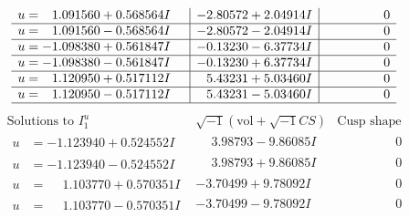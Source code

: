 \documentclass[1p]{elsarticle_modified}
\theoremstyle{definition}
\newcommand{\I}{\sqrt{-1}}
\begin{document}
$$\begin{array}{c|c|c}
\begin{aligned}
u &= \phantom{-}1.091560 + 0.568564 I\end{aligned}
 & -2.80572 + 2.04914 I & \phantom{-0.000000 } 0 \\ \hline\begin{aligned}
u &= \phantom{-}1.091560 - 0.568564 I\end{aligned}
 & -2.80572 - 2.04914 I & \phantom{-0.000000 } 0 \\ \hline\begin{aligned}
u &= -1.098380 + 0.561847 I\end{aligned}
 & -0.13230 - 6.37734 I & \phantom{-0.000000 } 0 \\ \hline\begin{aligned}
u &= -1.098380 - 0.561847 I\end{aligned}
 & -0.13230 + 6.37734 I & \phantom{-0.000000 } 0 \\ \hline\begin{aligned}
u &= \phantom{-}1.120950 + 0.517112 I\end{aligned}
 & \phantom{-}5.43231 + 5.03460 I & \phantom{-0.000000 } 0 \\ \hline\begin{aligned}
u &= \phantom{-}1.120950 - 0.517112 I\end{aligned}
 & \phantom{-}5.43231 - 5.03460 I & \phantom{-0.000000 } 0\\
 \hline 
 \end{array}$$\newpage$$\begin{array}{c|c|c}  
\text{Solutions to }I^u_{1}& \I (\text{vol} + \sqrt{-1}CS) & \text{Cusp shape}\\
 \hline 
\begin{aligned}
u &= -1.123940 + 0.524552 I\end{aligned}
 & \phantom{-}3.98793 - 9.86085 I & \phantom{-0.000000 } 0 \\ \hline\begin{aligned}
u &= -1.123940 - 0.524552 I\end{aligned}
 & \phantom{-}3.98793 + 9.86085 I & \phantom{-0.000000 } 0 \\ \hline\begin{aligned}
u &= \phantom{-}1.103770 + 0.570351 I\end{aligned}
 & -3.70499 + 9.78092 I & \phantom{-0.000000 } 0 \\ \hline\begin{aligned}
u &= \phantom{-}1.103770 - 0.570351 I\end{aligned}
 & -3.70499 - 9.78092 I & \phantom{-0.000000 } 0 \\ \hline\begin{aligned}

\end{aligned}
\end{array}$$
\end{document}
